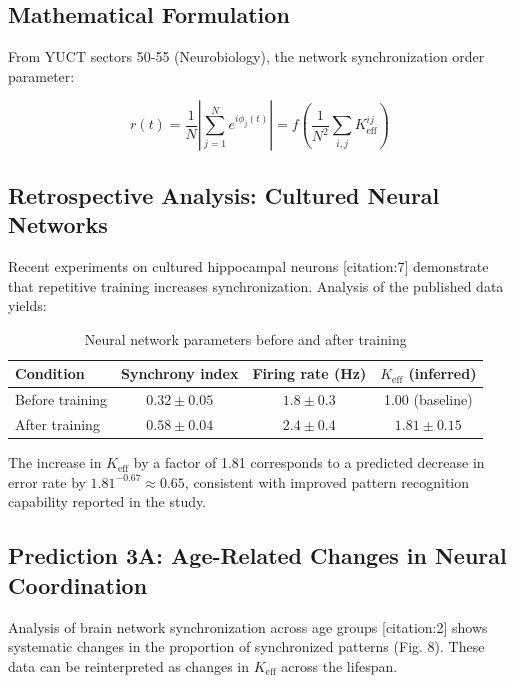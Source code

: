 \documentclass[11pt]{article}
\begin{document}
	\subsection{Mathematical Formulation}
	
	From YUCT sectors 50-55 (Neurobiology), the network synchronization order parameter:
	
	\begin{equation}
		r(t) = \frac{1}{N}\left|\sum_{j=1}^N e^{i\phi_j(t)}\right| = f\left(\frac{1}{N^2}\sum_{i,j} K_{\text{eff}}^{ij}\right)
		\label{eq:sync_order}
	\end{equation}
	
	\subsection{Retrospective Analysis: Cultured Neural Networks}
	
	Recent experiments on cultured hippocampal neurons [citation:7] demonstrate that repetitive training increases synchronization. Analysis of the published data yields:
	
	\begin{table}[h]
		\centering
		\caption{Neural network parameters before and after training}
		\label{tab:neural-training}
		\begin{tabular}{lccc}
			\toprule
			\textbf{Condition} & \textbf{Synchrony index} & \textbf{Firing rate (Hz)} & \(K_{\text{eff}}\) (inferred) \\
			\midrule
			Before training & \(0.32 \pm 0.05\) & \(1.8 \pm 0.3\) & 1.00 (baseline) \\
			After training & \(0.58 \pm 0.04\) & \(2.4 \pm 0.4\) & \(1.81 \pm 0.15\) \\
			\bottomrule
		\end{tabular}
	\end{table}
	
	The increase in \(K_{\text{eff}}\) by a factor of 1.81 corresponds to a predicted decrease in error rate by \(1.81^{-0.67} \approx 0.65\), consistent with improved pattern recognition capability reported in the study.
	
	\subsection{Prediction 3A: Age-Related Changes in Neural Coordination}
	
	Analysis of brain network synchronization across age groups [citation:2] shows systematic changes in the proportion of synchronized patterns (Fig. 8). These data can be reinterpreted as changes in \(K_{\text{eff}}\) across the lifespan.
	
\end{document}

